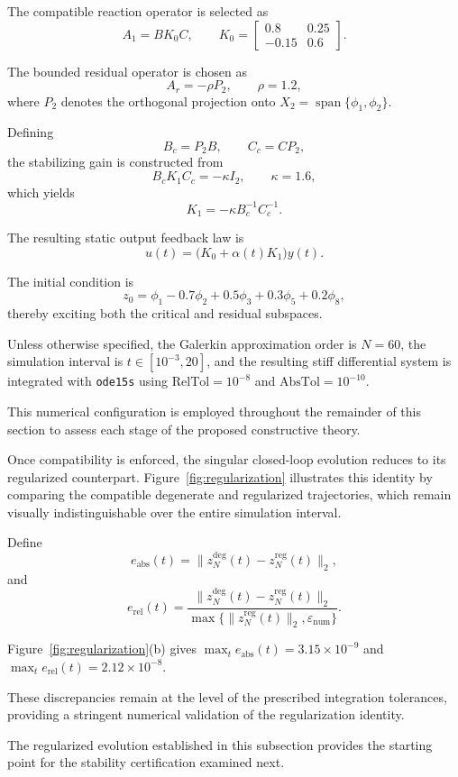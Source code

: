 \documentclass[pdflatex,sn-mathphys-num]{sn-jnl}
\theoremstyle{thmstyleone}%
\theoremstyle{thmstyletwo}%
\theoremstyle{thmstylethree}%
\begin{document}
The compatible reaction operator is selected as
\[
A_1=BK_0C,
\qquad
K_0=
\begin{bmatrix}
0.8&0.25\\
-0.15&0.6
\end{bmatrix}.
\]

The bounded residual operator is chosen as
\[
A_r=-\rho P_2,
\qquad
\rho=1.2,
\]
where \(P_2\) denotes the orthogonal projection onto \(X_2=\operatorname{span}\{\phi_1,\phi_2\}\).

Defining
\[
B_c=P_2B,
\qquad
C_c=CP_2,
\]
the stabilizing gain is constructed from
\[
B_cK_1C_c
=
-\kappa I_2,
\qquad
\kappa=1.6,
\]
which yields
\[
K_1
=
-\kappa B_c^{-1}C_c^{-1}.
\]

The resulting static output feedback law is
\[
u(t)
=
\bigl(K_0+\alpha(t)K_1\bigr)y(t).
\]

The initial condition is
\[
z_0
=
\phi_1
-0.7\phi_2
+0.5\phi_3
+0.3\phi_5
+0.2\phi_8,
\]
thereby exciting both the critical and residual subspaces.

Unless otherwise specified, the Galerkin approximation order is \(N=60\), the simulation interval is \(t\in[10^{-3},20]\), and the resulting stiff differential system is integrated with \texttt{ode15s} using
\(\mathrm{RelTol}=10^{-8}\) and
\(\mathrm{AbsTol}=10^{-10}\).

This numerical configuration is employed throughout the remainder of this section to assess each stage of the proposed constructive theory.

Once compatibility is enforced, the singular closed-loop evolution reduces to its regularized counterpart. Figure~\ref{fig:regularization} illustrates this identity by comparing the compatible degenerate and regularized trajectories, which remain visually indistinguishable over the entire simulation interval.

Define
\[
e_{\mathrm{abs}}(t)
=
\|z_N^{\mathrm{deg}}(t)-z_N^{\mathrm{reg}}(t)\|_2,
\]
and
\[
e_{\mathrm{rel}}(t)
=
\frac{
\|z_N^{\mathrm{deg}}(t)-z_N^{\mathrm{reg}}(t)\|_2
}{
\max\{\|z_N^{\mathrm{reg}}(t)\|_2,\varepsilon_{\mathrm{num}}\}
}.
\]

Figure~\ref{fig:regularization}(b) gives \(\max_t e_{\mathrm{abs}}(t)=3.15\times10^{-9}\) and \(\max_t e_{\mathrm{rel}}(t)=2.12\times10^{-8}\).

These discrepancies remain at the level of the prescribed integration tolerances, providing a stringent numerical validation of the regularization identity.

The regularized evolution established in this subsection provides the starting point for the stability certification examined next.
\end{document}
